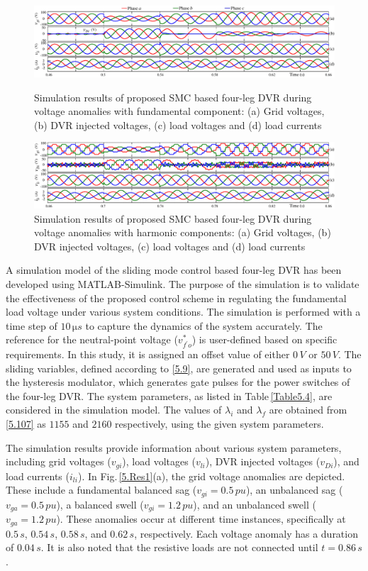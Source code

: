 \begin{figure}\centering
	\includegraphics[scale=0.8	]{figures/Chapter_5/Mine/Res11.pdf}
	\caption{Simulation results of proposed SMC based four-leg DVR during voltage anomalies with fundamental component: (a) Grid voltages, (b) DVR injected voltages, (c) load voltages and (d) load currents} 
	\label{5.Res1} \vspace*{1cm}
	\includegraphics[scale=0.8	]{figures/Chapter_5/Mine/Res21.pdf}
	\caption{Simulation results of proposed SMC based four-leg DVR during voltage anomalies with harmonic components: (a) Grid voltages, (b) DVR injected voltages, (c) load voltages and (d) load currents} 
	\label{5.Res2}
\end{figure} 
A simulation model of the sliding mode control based four-leg DVR has been developed using MATLAB-Simulink. The purpose of the simulation is to validate the effectiveness of the proposed control scheme in regulating the fundamental load voltage under various system conditions. The simulation is performed with a time step of $10\,\si{\micro s}$ to capture the dynamics of the system accurately.
The reference for the neutral-point voltage ($v^{*}_{f^{\prime}o}$) is user-defined based on specific requirements. In this study, it is assigned an offset value of either $0\,\si{V}$ or $50\,\si{V}$. The sliding variables, defined according to \eqref{5.9}, are generated and used as inputs to the hysteresis modulator, which generates gate pulses for the power switches of the four-leg DVR. The system parameters, as listed in Table\,\ref{Table5.4}, are considered in the simulation model. The values of $\lambda_{i}$ and $\lambda_{f}$ are obtained from \eqref{5.107} as $1155$ and $2160$ respectively, using the given system parameters.

The simulation results provide information about various system parameters, including grid voltages ($v_{gi}$), load voltages ($v_{li}$), DVR injected voltages ($v_{Di}$), and load currents ($i_{li}$). In Fig.\,\ref{5.Res1}(a), the grid voltage anomalies are depicted. These include a fundamental balanced sag ($v_{gi} = 0.5\,\si{pu}$), an unbalanced sag ($v_{ga} = 0.5\,\si{pu}$), a balanced swell ($v_{gi} = 1.2\,\si{pu}$), and an unbalanced swell ($v_{ga} = 1.2\,\si{pu}$). These anomalies occur at different time instances, specifically at $0.5 \, \si{s}$, $0.54 \, \si{s}$, $0.58 \, \si{s}$, and $0.62 \, \si{s}$, respectively. Each voltage anomaly has a duration of $0.04 \, \si{s}$. It is also noted that the resistive loads are not connected until $t = 0.86\,\si{s}$.

